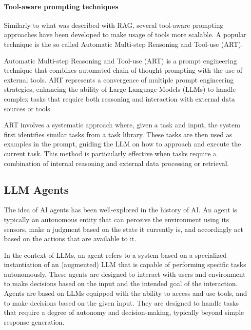 \documentclass[conference]{IEEEtran}
\begin{document}
\paragraph{Tool-aware prompting techniques}

Similarly to what was described with RAG, several tool-aware prompting approaches have been developed to make usage of tools more scalable. A popular technique is the so called 
Automatic Multi-step Reasoning and Tool-use (ART).

Automatic Multi-step Reasoning and Tool-use (ART) \cite{paranjape2023art} is a prompt engineering technique that combines automated chain of thought prompting with the use of external tools. ART represents a convergence of multiple prompt engineering strategies, enhancing the ability of Large Language Models (LLMs) to handle complex tasks that require both reasoning and interaction with external data sources or tools.

ART involves a systematic approach where, given a task and input, the system first identifies similar tasks from a task library. These tasks are then used as examples in the prompt, guiding the LLM on how to approach and execute the current task. This method is particularly effective when tasks require a combination of internal reasoning and external data processing or retrieval.


\subsection{\textbf{LLM Agents}}

The idea of AI agents has been well-explored in the history of AI. An agent is typically an autonomous entity that can perceive the environment using its sensors, make a judgment based on the state it currently is, and accordingly act based on the actions that are available to it. 

In the context of LLMs, an agent refers to a system based on a specialized instantiation of an (augmented) LLM that is capable of performing specific tasks autonomously. These agents are designed to interact with users and environment to
make decisions based on the input and the intended goal of the interaction. Agents are based on LLMs equipped with the ability to access and use tools, and to make decisions based on the given input. They are designed to handle tasks that require a degree of autonomy and decision-making, typically beyond simple response generation.  
\end{document}
